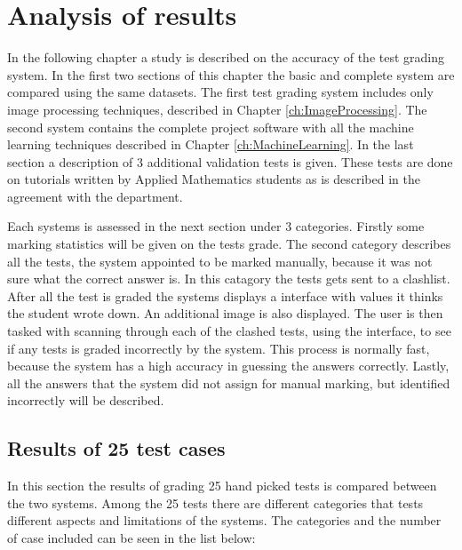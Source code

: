 \chapter{Analysis of results}
\label{ch:Results}
\ifpdf
\graphicspath{{Chapter5/Chapter5Figures/}}
\fi

In the following chapter a study is described on the accuracy of the test grading system. In the first two sections of this chapter the basic and complete system are compared using the same datasets. The first test grading system includes only image processing techniques, described in Chapter \ref{ch:ImageProcessing}. The second system contains the complete project software with all the machine learning techniques described in Chapter \ref{ch:MachineLearning}. In the last section a description of 3 additional validation tests is given. These tests are done on tutorials written by Applied Mathematics students as is described in the agreement with the department.

Each systems is assessed in the next section under 3 categories. Firstly some marking statistics will be given on the tests grade. The second category describes all the tests, the system appointed to be marked manually, because it was not sure what the correct answer is. In this catagory the tests gets sent to a clashlist. After all the test is graded the systems displays a interface with values it thinks the student wrote down. An additional image is also displayed. The user is then tasked with scanning through each of the clashed tests, using the interface, to see if any tests is graded incorrectly by the system. This process is normally fast, because the system has a high accuracy in guessing the answers correctly. Lastly, all the answers that the system did not assign for manual marking, but identified incorrectly will be described.

\section{Results of 25 test cases}

In this section the results of grading 25 hand picked tests is compared between the two systems. Among the 25 tests there are different categories that tests different aspects and limitations of the systems. The categories and the number of case included can be seen in the list below:

